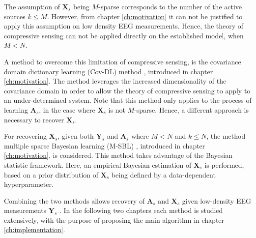 The assumption of $\mathbf{X}_s$ being $M$-sparse corresponds to the number of the active sources $k \leq M$. 
However, from chapter \ref{ch:motivation} it can not be justified to apply this assumption on low density EEG measurements. 
Hence, the theory of compressive sensing can not be applied directly on the established model, when $M < N$. 

A method to overcome this limitation of compressive sensing, is the covariance domain dictionary learning (Cov-DL) method \cite{Balkan2015}, introduced in chapter \ref{ch:motivation}.
The method leverages the increased dimensionality of the covariance domain in order to allow the theory of compressive sensing to apply to an under-determined system. 
Note that this method only applies to the process of learning $\mathbf{A}_s$, in the case where $\mathbf{X}_s$ is not $M$-sparse. 
Hence, a different approach is necessary to recover $\mathbf{X}_s$.

For recovering $\mathbf{X}_s$, given both $\mathbf{Y}_s$ and $\mathbf{A}_s$ where $M < N$ and $k \leq N$, the method multiple sparse Bayesian learning (M-SBL) \cite{Balkan2014}, introduced in chapter \ref{ch:motivation}, is considered.
This method takes advantage of the Bayesian statistic framework. 
Here, an empirical Bayesian estimation of $\mathbf{X}_s$ is performed, based on a prior distribution of $\mathbf{X}_s$ being defined by a data-dependent hyperparameter.  

Combining the two methods allows recovery of $\mathbf{A}_s$ and $\mathbf{X}_s$ given low-density EEG measurements $\mathbf{Y}_s$ \cite{phd2015}. 
In the following two chapters each method is studied extensively, with the purpose of proposing the main algorithm in chapter \ref{ch:implementation}. 
